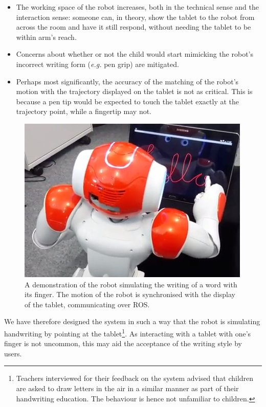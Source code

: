 \documentclass{article}
\newcommand{\eg}{\textit{e.g.}\xspace}
\begin{document}
\begin{itemize}

    \item The working space of the robot increases, both in the technical sense
        and the interaction sense: someone can, in theory, show the tablet to
        the robot from across the room and have it still respond, without
        needing the tablet to be within arm's reach.

    \item Concerns about whether or not the child would start mimicking the
        robot's incorrect writing form (\eg pen grip) are mitigated. 

    \item Perhaps most significantly, the accuracy of the matching of the
        robot's motion with the trajectory displayed on the tablet is not as
        critical. This is because a pen tip would be expected to touch the
        tablet exactly at the trajectory point, while a fingertip may not.

\end{itemize}

\begin{figure}[thpb]
     \begin{center}
            \includegraphics[width=0.7\linewidth]{naoWriting2.png}
    \end{center}
    \caption{A demonstration of the robot simulating the writing of a word with
    its finger. The motion of the robot is synchronised with the display of the
    tablet, communicating over ROS.}%

   \label{fig:naoWriting}
\end{figure}

We have therefore designed the system in such a way that the robot is simulating
handwriting by pointing at the tablet\footnote{Teachers interviewed for their
feedback on the system advised that children are asked to draw letters in
the air in a similar manner as part of their handwriting education. The
behaviour is hence not unfamiliar to children.}. As interacting with a
tablet with one's finger is not uncommon, this may aid the acceptance of the
writing style by users. 
\end{document}
